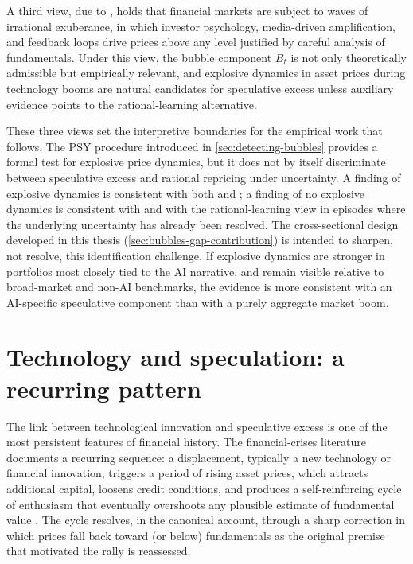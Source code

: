 A third view, due to \citet{shiller2000}, holds that financial markets are subject to waves of irrational exuberance, in which investor psychology, media-driven amplification, and feedback loops drive prices above any level justified by careful analysis of fundamentals. Under this view, the bubble component $B_t$ is not only theoretically admissible but empirically relevant, and explosive dynamics in asset prices during technology booms are natural candidates for speculative excess unless auxiliary evidence points to the rational-learning alternative.

These three views set the interpretive boundaries for the empirical work that follows. The PSY procedure introduced in \cref{sec:detecting-bubbles} provides a formal test for explosive price dynamics, but it does not by itself discriminate between speculative excess and rational repricing under uncertainty. A finding of explosive dynamics is consistent with both \citet{shiller2000} and \citet{pastorVeronesi2009}; a finding of no explosive dynamics is consistent with \citet{fama1970} and with the rational-learning view in episodes where the underlying uncertainty has already been resolved. The cross-sectional design developed in this thesis (\cref{sec:bubbles-gap-contribution}) is intended to sharpen, not resolve, this identification challenge. If explosive dynamics are stronger in portfolios most closely tied to the AI narrative, and remain visible relative to broad-market and non-AI benchmarks, the evidence is more consistent with an AI-specific speculative component than with a purely aggregate market boom.

\section{Technology and speculation: a recurring pattern}
\label{sec:technology-speculation}

The link between technological innovation and speculative excess is one of the most persistent features of financial history. The financial-crises literature documents a recurring sequence: a displacement, typically a new technology or financial innovation, triggers a period of rising asset prices, which attracts additional capital, loosens credit conditions, and produces a self-reinforcing cycle of enthusiasm that eventually overshoots any plausible estimate of fundamental value \citep{kindlebergerAliber2015}. The cycle resolves, in the canonical account, through a sharp correction in which prices fall back toward (or below) fundamentals as the original premise that motivated the rally is reassessed.


